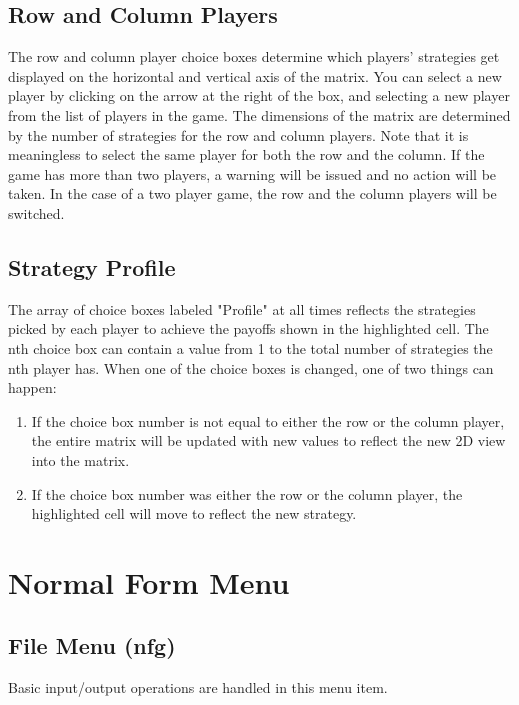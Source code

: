 \subsection{Row and Column Players} The row and column player choice boxes
determine which players' strategies get displayed on the horizontal and
vertical axis of the matrix.  You can select a new player by clicking on the 
arrow at the right of the box, and selecting a new player from the 
list of players in the game.  The dimensions of the matrix are
determined by the number of strategies for the row and column players.
Note that it is meaningless to select the same player for both the row and
the column.  If the game has more than two players, a warning will be
issued and no action will be taken.  In the case of a two player game, the
row and the column players will be switched.

\subsection{Strategy Profile}
The array of choice boxes labeled "Profile" at all times reflects the
strategies picked by each player to achieve the payoffs shown in the
highlighted cell.  The nth choice box can contain a value from 1 to the
total number of strategies the nth player has.  When one of the choice
boxes is changed, one of two things can happen:

\begin{enumerate}
\item If the choice box number is not equal to either the row or
the column player, the entire matrix will be updated with new values to
reflect the new 2D view into the matrix.
\item If the choice box number was either the row or the column player,
the highlighted cell will move to reflect the new strategy.
\end{enumerate}

\section{Normal Form Menu}

\subsection{File Menu (nfg)}\label{nffile}

Basic input/output operations are handled in this menu item.  

